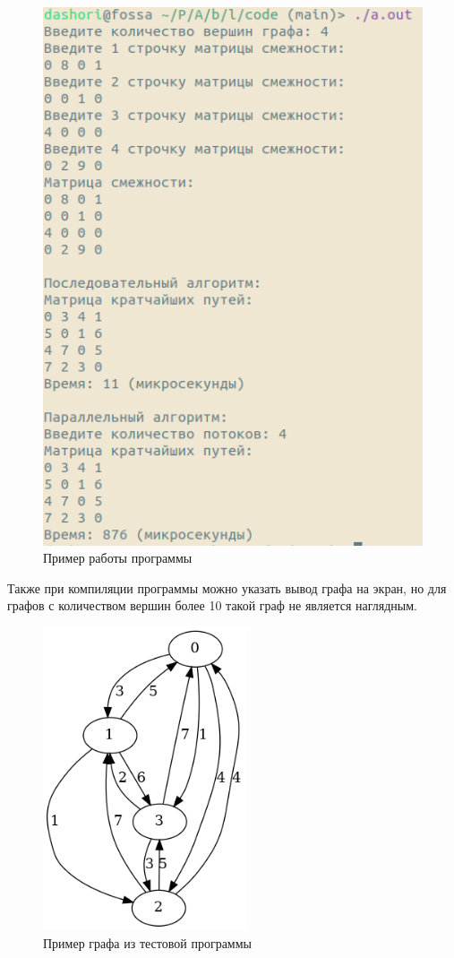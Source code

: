 \begin{figure}[H]
	\centering
	\includegraphics[width=120mm]{images/example}
	\caption{Пример работы программы}
	\label{img:example}
\end{figure}

Также при компиляции программы можно указать вывод графа на экран, но для графов с количеством вершин более 10 такой граф не является наглядным.
\begin{figure}[H]
	\centering
	\includegraphics[width=60mm]{images/exampleGraph.png}
	\caption{Пример графа из тестовой программы}
	\label{img:example}
\end{figure}


